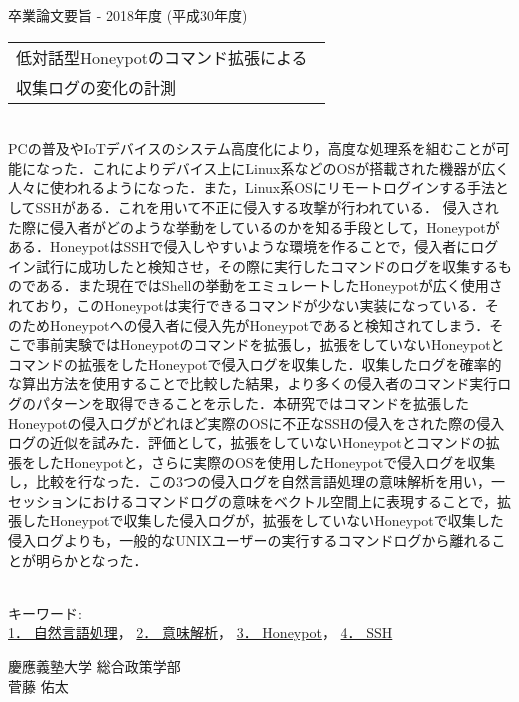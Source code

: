 卒業論文要旨 - 2018年度 (平成30年度)
\begin{center}
\begin{large}
\begin{tabular}{|M{0.97\linewidth}|}
    \hline
   低対話型Honeypotのコマンド拡張による\\収集ログの変化の計測\\
    \hline
\end{tabular}
\end{large}
\end{center}

~ \\

PCの普及やIoTデバイスのシステム高度化により，高度な処理系を組むことが可能になった．これによりデバイス上にLinux系などのOSが搭載された機器が広く人々に使われるようになった．また，Linux系OSにリモートログインする手法としてSSHがある．これを用いて不正に侵入する攻撃が行われている．
侵入された際に侵入者がどのような挙動をしているのかを知る手段として，Honeypotがある．HoneypotはSSHで侵入しやすいような環境を作ることで，侵入者にログイン試行に成功したと検知させ，その際に実行したコマンドのログを収集するものである．また現在ではShellの挙動をエミュレートしたHoneypotが広く使用されており，このHoneypotは実行できるコマンドが少ない実装になっている．そのためHoneypotへの侵入者に侵入先がHoneypotであると検知されてしまう．そこで事前実験ではHoneypotのコマンドを拡張し，拡張をしていないHoneypotとコマンドの拡張をしたHoneypotで侵入ログを収集した．収集したログを確率的な算出方法を使用することで比較した結果，より多くの侵入者のコマンド実行ログのパターンを取得できることを示した．本研究ではコマンドを拡張したHoneypotの侵入ログがどれほど実際のOSに不正なSSHの侵入をされた際の侵入ログの近似を試みた．評価として，拡張をしていないHoneypotとコマンドの拡張をしたHoneypotと，さらに実際のOSを使用したHoneypotで侵入ログを収集し，比較を行なった．この3つの侵入ログを自然言語処理の意味解析を用い，一セッションにおけるコマンドログの意味をベクトル空間上に表現することで，拡張したHoneypotで収集した侵入ログが，拡張をしていないHoneypotで収集した侵入ログよりも，一般的なUNIXユーザーの実行するコマンドログから離れることが明らかとなった．

~ \\
キーワード:\\
\underline{1． 自然言語処理}，
\underline{2． 意味解析}，
\underline{3． Honeypot}，
\underline{4． SSH}
\begin{flushright}
慶應義塾大学 総合政策学部\\
菅藤 佑太
\end{flushright}
